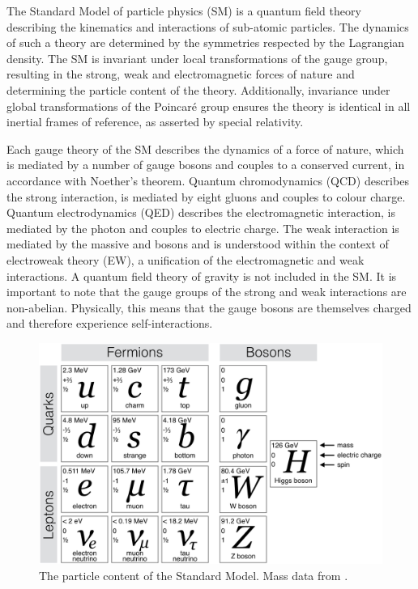 
The Standard Model of particle physics (SM) is a quantum field theory describing
the kinematics and interactions of sub-atomic particles. The dynamics of such a 
theory are determined by the symmetries respected by the Lagrangian density.
The SM is invariant under local transformations of the \SMgroup gauge group,
resulting in the strong, weak and electromagnetic forces of nature and determining
the particle content of the theory. Additionally, invariance under global 
transformations of the Poincaré group ensures the theory is identical in all 
inertial frames of reference, as asserted by special relativity.

Each gauge theory of the SM describes the dynamics of a force of nature, which 
is mediated by a number of gauge bosons and couples to a conserved current, in 
accordance with Noether's theorem. Quantum chromodynamics (QCD) describes the strong 
interaction, is mediated by eight gluons and couples to colour charge. Quantum 
electrodynamics (QED) describes the electromagnetic interaction, is mediated by the 
photon and couples to electric charge. The weak interaction is mediated by the massive 
\PWpm and \PZzero bosons and is understood within the context of electroweak theory (EW),
a unification of the electromagnetic and weak interactions. A quantum field theory of
gravity is not included in the SM. It is important to note that the gauge groups of the
strong and weak interactions are non-abelian. Physically, this means that the
gauge bosons are themselves charged and therefore experience self-interactions.

\begin{figure}
	\includegraphics[width=\largefigwidth]{tex/motivation/sm_particles}
	\caption{The particle content of the Standard Model. Mass data from \cite{PDG}.}
	\label{fig:sm_particles}
\end{figure}

